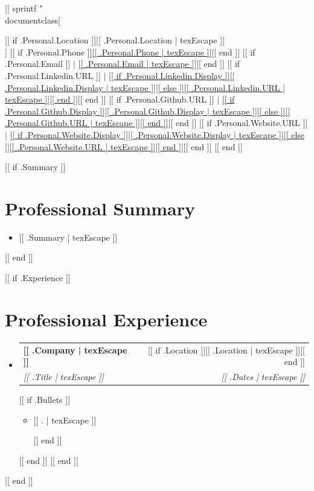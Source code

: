 [[ sprintf "\\documentclass[%
\makeatletter
\newcommand{\cpSubheading}[4]{%
  \vspace{-1pt}
  \item
  \begin{tabular*}{\linewidth}{@{}l@{\extracolsep{\fill}}r@{}}
    \textbf{#1} & \small #2 \\
    \textit{\small #3} & \textit{\small #4} \\
  \end{tabular*}\vspace{-6pt}%
}
\newcommand{\cpItem}[1]{%
  \item\small{#1\vspace{-2pt}}%
}
\newcommand{\cpListStart}{\begin{itemize}[leftmargin=0.15in, label={}]}
\newcommand{\cpListEnd}{\end{itemize}}
\newcommand{\cpBulletStart}{\begin{itemize}[leftmargin=0.2in, label={\tiny$\bullet$}, itemsep=0pt, topsep=2pt, parsep=0pt]}
\newcommand{\cpBulletEnd}{\end{itemize}\vspace{-4pt}}
\makeatother
\begin{document}
\begin{center}
  [[ if .Personal.Location ]]\small [[ .Personal.Location | texEscape ]] \\[[ end ]]
  \small
  [[ if .Personal.Phone ]]\href{tel:[[ .Personal.Phone | texEscape ]]}{[[ .Personal.Phone | texEscape ]]}[[ end ]]%
  [[ if .Personal.Email ]] $|$ \href{mailto:[[ .Personal.Email | texEscape ]]}{[[ .Personal.Email | texEscape ]]}[[ end ]]%
  [[ if .Personal.Linkedin.URL ]] $|$ \href{[[ .Personal.Linkedin.URL | texEscape ]]}{[[ if .Personal.Linkedin.Display ]][[ .Personal.Linkedin.Display | texEscape ]][[ else ]][[ .Personal.Linkedin.URL | texEscape ]][[ end ]]}[[ end ]]%
  [[ if .Personal.Github.URL ]] $|$ \href{[[ .Personal.Github.URL | texEscape ]]}{[[ if .Personal.Github.Display ]][[ .Personal.Github.Display | texEscape ]][[ else ]][[ .Personal.Github.URL | texEscape ]][[ end ]]}[[ end ]]%
  [[ if .Personal.Website.URL ]] $|$ \href{[[ .Personal.Website.URL | texEscape ]]}{[[ if .Personal.Website.Display ]][[ .Personal.Website.Display | texEscape ]][[ else ]][[ .Personal.Website.URL | texEscape ]][[ end ]]}[[ end ]]
[[ end ]]
\end{center}
\vspace{-6pt}

[[ if .Summary ]]
\section{Professional Summary}
\cpListStart
  \small\item{[[ .Summary | texEscape ]]}
\cpListEnd
\vspace{-2pt}
[[ end ]]

[[ if .Experience ]]
\section{Professional Experience}
\cpListStart
  [[ range .Experience ]]
  \cpSubheading
    {[[ .Company | texEscape ]]}{[[ if .Location ]][[ .Location | texEscape ]][[ end ]]}
    {[[ .Title | texEscape ]]}{[[ .Dates | texEscape ]]}
    [[ if .Bullets ]]
    \cpBulletStart
      [[ range texLines .Bullets ]]\cpItem{[[ . | texEscape ]]}
      [[ end ]]
    \cpBulletEnd
    [[ end ]]
  [[ end ]]
\cpListEnd
[[ end ]]
\end{document}
